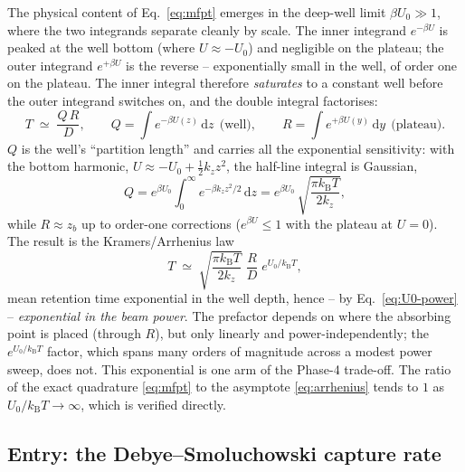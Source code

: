 \documentclass[11pt]{article}
\newcommand{\dd}{\mathrm{d}}
\newcommand{\kB}{k_{\mathrm{B}}}
\begin{document}
The physical content of Eq.~\eqref{eq:mfpt} emerges in the deep-well limit $\beta U_0 \gg 1$, where the two integrands separate cleanly by scale. The inner integrand $e^{-\beta U}$ is peaked at the well bottom (where $U \approx -U_0$) and negligible on the plateau; the outer integrand $e^{+\beta U}$ is the reverse -- exponentially small in the well, of order one on the plateau. The inner integral therefore \emph{saturates} to a constant well before the outer integrand switches on, and the double integral factorises:
\begin{equation}
T \;\simeq\; \frac{Q\,R}{D},
\qquad
Q = \int e^{-\beta U(z)}\,\dd z \ \ \text{(well)},
\qquad
R = \int e^{+\beta U(y)}\,\dd y \ \ \text{(plateau)}.
\label{eq:factorised}
\end{equation}
$Q$ is the well's ``partition length'' and carries all the exponential sensitivity: with the bottom harmonic, $U \approx -U_0 + \tfrac12 k_z z^2$, the half-line integral is Gaussian,
\begin{equation}
Q = e^{\beta U_0}\int_0^\infty e^{-\beta k_z z^2/2}\,\dd z
= e^{\beta U_0}\,\sqrt{\frac{\pi \kB T}{2k_z}},
\end{equation}
while $R \approx z_b$ up to order-one corrections ($e^{\beta U}\le 1$ with the plateau at $U=0$). The result is the Kramers/Arrhenius law \cite{Kramers1940,Hanggi1990}
\begin{equation}
T \;\simeq\; \sqrt{\frac{\pi \kB T}{2k_z}}\;\frac{R}{D}\;e^{U_0/\kB T},
\label{eq:arrhenius}
\end{equation}
mean retention time exponential in the well depth, hence -- by Eq.~\eqref{eq:U0-power} -- \emph{exponential in the beam power}. The prefactor depends on where the absorbing point is placed (through $R$), but only linearly and power-independently; the $e^{U_0/\kB T}$ factor, which spans many orders of magnitude across a modest power sweep, does not. This exponential is one arm of the Phase-4 trade-off. The ratio of the exact quadrature \eqref{eq:mfpt} to the asymptote \eqref{eq:arrhenius} tends to $1$ as $U_0/\kB T \to \infty$, which is verified directly.

\subsection{Entry: the Debye--Smoluchowski capture rate}
\label{sec:capture}
\end{document}
